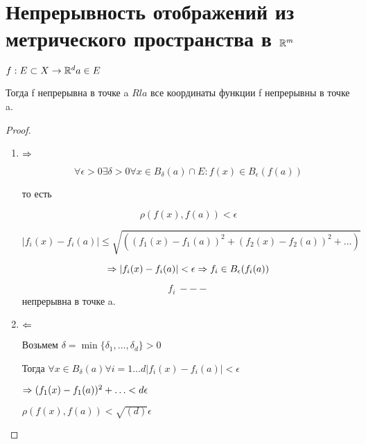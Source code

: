 ﻿\section{Непрерывность отображений из метрического пространства в $\mathbb{R}^m$}

\begin{theorem}{}

 $f: E \subset X \to \mathbb{R}^{d} a \in E$

 Тогда f  непрерывна в точке a $Rla$ все координаты функции f непрерывны в точке a.
 
\end{theorem}

\begin{proof}
 \begin{enumerate}
 \item $\Rightarrow$

  $$\forall \epsilon > 0 \exists \delta > 0 \forall x \in B_{\delta}(a) \cap E: f(x) \in B_{\epsilon}(f(a)) $$

  то есть 

  $$\rho(f(x), f(a)) < \epsilon$$

  $$|f_i(x) - f_i(a)| \le \sqrt{((f_1(x) - f_1(a))^2 + (f_2(x) - f_2(a))^2 + \ldots)}$$

  $$\Rightarrow |f_i(x) - f_i(a)| < \epsilon \Rightarrow f_i \in B_{\epsilon}(f_i(a)) $$

  $$f_i ~---$$ непрерывна в точке a.
 \item $\Leftarrow$
  
  Возьмем $\delta = \min\{\delta_1, \ldots, \delta_d\} > 0$

  Тогда $\forall x \in B_{\delta}(a) \forall i = 1 \ldots d |f_i(x) - f_i(a)| < \epsilon$

  $\Rightarrow (f_1(x) - f_1(a))^2 + \ldots < d \epsilon$

 $\rho(f(x), f(a)) < \sqrt{(d)} \epsilon$ 
 
 \end{enumerate}
\end{proof}
